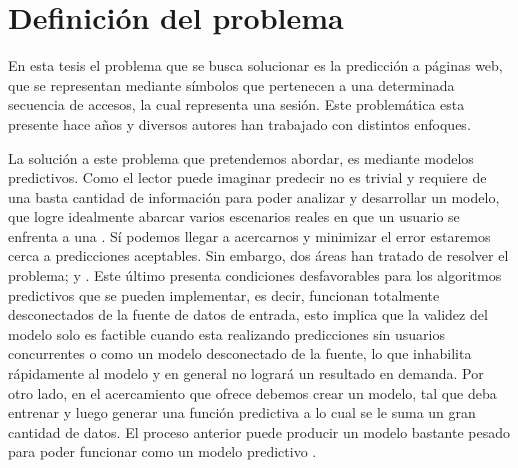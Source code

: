 
\section{Definición del problema}



En esta tesis el problema que se busca solucionar es la predicción a páginas web, que se representan mediante símbolos que pertenecen a una determinada secuencia de accesos, la cual representa una sesión. Este problemática esta presente hace años y diversos autores han trabajado con distintos enfoques. 



La solución a este problema que pretendemos abordar, es mediante modelos predictivos. Como el lector puede imaginar predecir no es trivial y requiere de una basta cantidad de  información para poder analizar y desarrollar un modelo, que logre idealmente abarcar varios escenarios reales en que un usuario se enfrenta a una \web. Sí podemos llegar a acercarnos y minimizar el error estaremos cerca a predicciones aceptables. Sin embargo, dos áreas han tratado de resolver el problema; \machinelearning y \datacompression. Este último presenta condiciones desfavorables para los algoritmos predictivos que se pueden implementar, es decir, funcionan totalmente desconectados de la fuente de datos de entrada, esto implica que la validez del modelo solo es factible cuando esta realizando predicciones sin usuarios concurrentes o como un modelo desconectado de la fuente, lo que inhabilita rápidamente al modelo y en general no logrará un resultado en demanda. Por otro lado, en el acercamiento que ofrece \machinelearning debemos crear un modelo, tal que  deba entrenar y luego generar una función predictiva a lo cual se le suma un gran cantidad de datos. El proceso anterior puede producir un modelo bastante pesado para poder funcionar como un modelo predictivo \online. 

